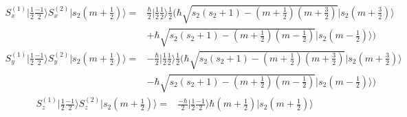 \begin{enumerate}
        \begin{align*}
            S_x^{(1)}\bigg|\frac{1}{2}\frac{-1}{2}\bigg\rangle
            S_x^{(2)}\bigg|s_2\left(m+\frac{1}{2}\right)\bigg\rangle
            =&\frac{\hbar}{2}\bigg|\frac{1}{2}\frac{1}{2}\bigg\rangle
            \frac{1}{2}\bigg(
            \hbar\sqrt{s_2(s_2+1)-(m+\frac{1}{2})(m+\frac{3}{2})}
            \bigg|s_2\left(m+\frac{3}{2}\right)\bigg\rangle
            \\&+
            \hbar\sqrt{s_2(s_2+1)-(m+\frac{1}{2})(m-\frac{1}{2})}
            \bigg|s_2\left(m-\frac{1}{2}\right)\bigg\rangle
            \bigg)
        \end{align*}
        \begin{align*}
            S_y^{(1)}\bigg|\frac{1}{2}\frac{-1}{2}\bigg\rangle
            S_y^{(2)}\bigg|s_2\left(m+\frac{1}{2}\right)\bigg\rangle
            =&-\frac{\hbar}{2}\bigg|\frac{1}{2}\frac{1}{2}\bigg\rangle
            \frac{1}{2}\bigg(
            \hbar\sqrt{s_2(s_2+1)-(m+\frac{1}{2})(m+\frac{3}{2})}
            \bigg|s_2\left(m+\frac{3}{2}\right)\bigg\rangle
            \\&-
            \hbar\sqrt{s_2(s_2+1)-(m+\frac{1}{2})(m-\frac{1}{2})}
            \bigg|s_2\left(m-\frac{1}{2}\right)\bigg\rangle
            \bigg)
        \end{align*}
        \begin{align*}
            S_z^{(1)}\bigg|\frac{1}{2}\frac{-1}{2}\bigg\rangle
            S_z^{(2)}\bigg|s_2\left(m+\frac{1}{2}\right)\bigg\rangle
            =&\frac{-\hbar}{2}\bigg|\frac{1}{2}\frac{-1}{2}\bigg\rangle
            \hbar\left(m+\frac{1}{2}\right)
            \bigg|s_2\left(m+\frac{1}{2}\right)\bigg\rangle
        \end{align*}


\end{enumerate}
